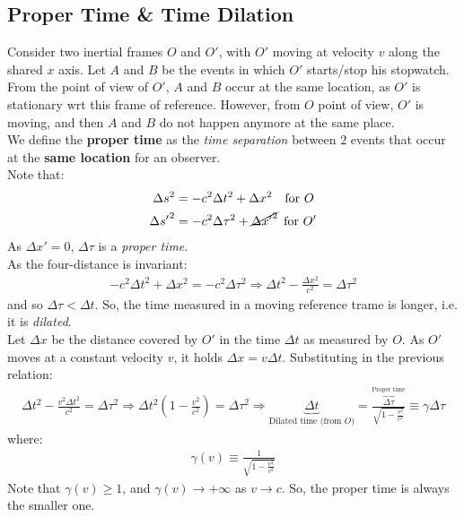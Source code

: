\documentclass[../template.tex]{subfiles}
\begin{document}
\subsection{Proper Time \& Time Dilation}
Consider two inertial frames $O$ and $O'$, with $O'$ moving at velocity $v$ along the shared $x$ axis. Let $A$ and $B$ be the events in which $O'$ starts/stop his stopwatch.\\
From the point of view of $O'$, $A$ and $B$ occur at the same location, as $O'$ is stationary wrt this frame of reference. However, from $O$ point of view, $O'$ is moving, and then $A$ and $B$ do not happen anymore at the same place.\\

We define the \textbf{proper time} as the \textit{time separation} between $2$ events that occur at the \textbf{same location} for an observer.\\
Note that:
\begin{align*}
\Delta s^2 &= -c^2 \Delta t^2 + \Delta x^2 \quad \text{for $O$}\\
\Delta {s'}^2 &= -c^2 \Delta \tau^2 +\cancel{\Delta {x'}^2} \>\>\text{for $O'$}
\end{align*}
As $\Delta x' = 0$, $\Delta \tau$ is a \textit{proper time}.\\
As the four-distance is invariant:
\begin{align*}
-c^2 \Delta t^2 + \Delta x^2 = -c^2 \Delta \tau^2 \Rightarrow \Delta t^2 - \frac{\Delta x^2}{c^2} = \Delta \tau^2
\end{align*}
and so $\Delta \tau < \Delta t$. So, the time measured in a moving reference trame is longer, i.e. it is \textit{dilated}.\\

Let $\Delta x$ be the distance covered by $O'$ in the time $\Delta t$ as measured by $O$. As $O'$ moves at a constant velocity $v$, it holds $\Delta x = v\Delta t$. Substituting in the previous relation:
\begin{align*}
\Delta t^2 -  \frac{v^2 \Delta t^2}{c^2} = \Delta \tau^2 \Rightarrow \Delta t^2 \left(1 - \frac{v^2}{c^2}\right) = \Delta \tau^2 \Rightarrow \underbrace{\Delta t}_{\text{Dilated time (from $O$)}} = \frac{\overbrace{\Delta \tau}^{\text{Proper time}}}{\sqrt{1-\frac{v^2}{c^2}}} \equiv \gamma \Delta\tau
\end{align*}
where:
\begin{align*}
\gamma(v) \equiv \frac{1}{\sqrt{1-\frac{v^2}{c^2}}}
\end{align*}
Note that $\gamma(v) \geq 1$, and $\gamma(v) \to +\infty$ as $v\to c$. So, the proper time is always the smaller one.
\end{document}
